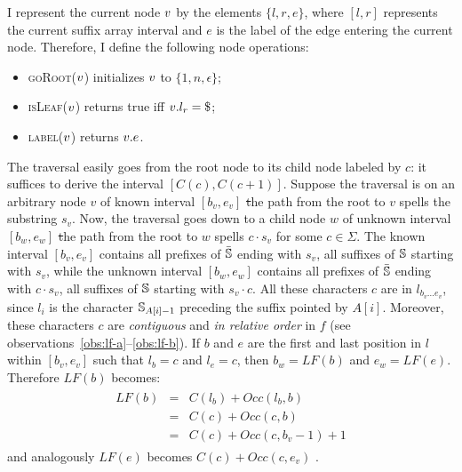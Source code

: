 I represent the current node $v$ by the elements $\{ l, r, e \}$, where $[l,r]$ represents the current suffix array interval and $e$ is the label of the edge entering the current node.
Therefore, I define the following node operations:
\begin{itemize}
\item \textsc{goRoot}($v$) initializes $v$ to $\{ 1, n, \epsilon \}$;
\item \textsc{isLeaf}($v$) returns true iff $\StrieNode.l_r = \$$;
\item \textsc{label}($v$) returns $v.e$.
\end{itemize}

The traversal easily goes from the root node to its child node labeled by $c$: it suffices to derive the interval $[C(c),C(c+1)]$.
Suppose the traversal is on an arbitrary node $v$ of known interval $[b_v, e_v]$ \st the path from the root to $v$ spells the substring $s_v$.
Now, the traversal goes down to a child node $w$ of unknown interval $[b_w, e_w]$ \st the path from the root to $w$ spells $c \cdot s_v$ for some $c \in \Sigma$.
The known interval $[b_v, e_v]$ contains all prefixes of $\bar{\mathbb{S}}$ ending with $s_v$, \ie all suffixes of $\mathbb{S}$ starting with $s_v$, while the unknown interval $[b_w, e_w]$ contains all prefixes of $\bar{\mathbb{S}}$ ending with $c \cdot s_v$, \ie all suffixes of $\mathbb{S}$ starting with $s_v \cdot c$.
All these characters $c$ are in $l_{b_v \dots e_v}$, since $l_i$ is the character $\mathbb{S}_{A[i] - 1}$ preceding the suffix pointed by $A[i]$.
Moreover, these characters $c$ are \emph{contiguous} and \emph{in relative order} in $f$ (see observations~\ref{obs:lf-a}--\ref{obs:lf-b}).
If $b$ and $e$ are the first and last position in $l$ within $[b_v, e_v]$ such that $l_b = c$ and $l_e = c$, then $b_w = LF(b)$ and $e_w = LF(e)$.
Therefore $LF(b)$ becomes:
\begin{eqnarray}
\begin{array}{lcl}
LF(b) &=& C(l_b) + Occ(l_b, b)\\
 	  &=& C(c) + Occ(c, b)\\
	  &=& C(c) + Occ(c, b_v - 1) + 1
\end{array}
\end{eqnarray}
and analogously $LF(e)$ becomes $C(c) + Occ(c, e_v)$ \cite{Ferragina2000}.

